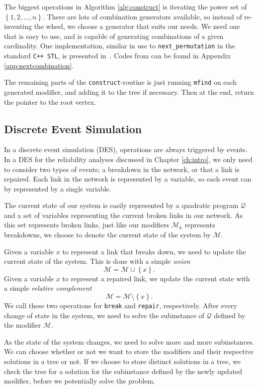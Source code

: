 The biggest operations in Algorithm \ref{alg:construct} is iterating the power
set of $\left\{1,2,\ldots,n\right\}$. There are lots of combination generators available, so
instead of re-inventing the wheel, we choose a generator that suits our needs.
We need one that is easy to use, and is capable of generating combinations of
a given cardinality. One implementation, similar in use to
\texttt{next\_permutation} in the standard \texttt{C++ STL}, is presented
in~\cite{codeproject}.
Codes from \cite{codeproject} can be found in Appendix
\ref{app:nextcombination}.

The remaining parts of the \texttt{construct}-routine is just running
\texttt{mfind} on each generated modifier, and adding it to the tree
if necessary. Then at the end, return the pointer to the root vertex.

\subsection{Discrete Event Simulation}
In a discrete event simulation (DES), operations are always triggered by events.
In a DES for the reliability analyses discussed in Chapter \ref{ch:intro},
we only need to consider two types of events; a breakdown in the network,
or that a link is repaired.
Each link in the network is represented by
a variable, so each event can by represented by a single variable.

The current state of our system is easily represented by a quadratic program 
$\mathcal{Q}$ and a set of variables representing the current broken links in
our network.
As this set represents broken links, just like our modifiers $\mathcal{M}_k$
represents breakdowns, we choose to denote the current state of the system
by $\mathcal{M}$. 

Given a variable $x$ to represent a link that breaks down, we need to
update the  current state of the system. This is done with a simple
\textit{union}
\[
\mathcal{M} = \mathcal{M} \cup \left\{x\right\}.
\]
Given a variable $x$ to represent a repaired link, we update the
current state with a simple \textit{relative complement}
\[
\mathcal{M} = \mathcal{M} \setminus \left\{x\right\}.
\]
We call these two operations for \texttt{break} and \texttt{repair}, respectively.
After every change of state in the system, we need to solve the subinstance
of $\mathcal{Q}$ defined by the modifier $\mathcal{M}$.

As the state of the system changes, we need to solve more and more subinstances.
We can choose whether or not we want to store the modifiers and their respective
solutions in a tree or not. If we choose to store distinct solutions in a tree,
we check the tree for a solution for the subinstance defined by the newly
updated modifier, before we potentially solve the problem.
